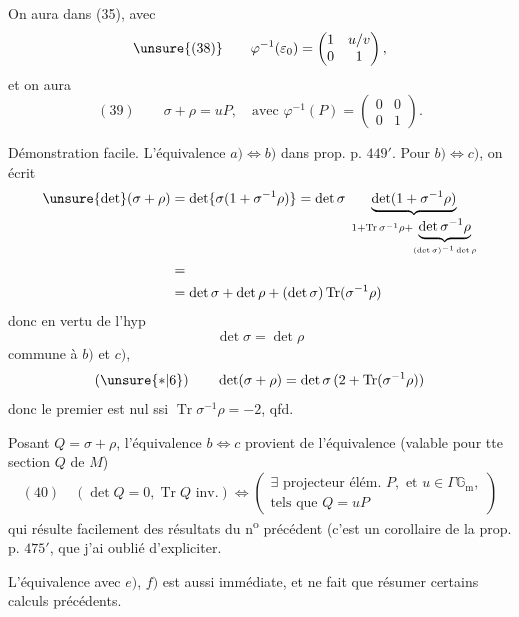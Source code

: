 
On aura dans (35), avec
\[
\unsure{(38)}\qquad\varphi^{-1}(\varepsilon_0)=\begin{pmatrix}1&u/v\\0&1\end{pmatrix},
\]
et on aura
\[
(39)\qquad\sigma+\rho=uP,\quad\text{avec }\varphi^{-1}(P)=\begin{pmatrix}0&0\\0&1\end{pmatrix}.
\]

Démonstration facile. L'équivalence $a)\Leftrightarrow b)$  dans prop. p. $449'$. Pour $b)\Leftrightarrow c)$, on écrit
\[
\begin{aligned}
\unsure{\det}(\sigma+\rho)
&=\det\{\sigma(1+\sigma^{-1}\rho)\}
=\det\sigma\;\underbrace{\det(1+\sigma^{-1}\rho)}_{1+\operatorname{Tr}\sigma^{-1}\rho+\underbrace{\det\sigma^{-1}\rho}_{(\det\sigma)^{-1}\det\rho}}\\
&=\\
&=\det\sigma+\det\rho+(\det\sigma)\operatorname{Tr}(\sigma^{-1}\rho)
\end{aligned}
\]
donc en vertu de l'hyp
\[
\det\sigma=\det\rho
\]
commune à $b)$ et $c)$, 
\[
(\unsure{*|6})\qquad\det(\sigma+\rho)=\det\sigma\,(2+\operatorname{Tr}(\sigma^{-1}\rho))
\]
donc le premier  est nul ssi $\operatorname{Tr}\sigma^{-1}\rho=-2$, qfd.



Posant $Q=\sigma+\rho$, l'équivalence $b\Leftrightarrow c$ provient de l'équivalence (valable pour tte section $Q$ de $M$)
\[
(40)\quad (\det Q=0,\operatorname{Tr}Q\text{ inv.})\Longleftrightarrow
\left(\begin{gathered}\exists\text{ projecteur élém. }P,\text{ et }u\in\Gamma\mathbb G_{\mathrm m},\\
\text{tels que }Q=uP\end{gathered}\right)
\]
qui résulte facilement des résultats du n\textsuperscript{o} précédent (c'est un corollaire de la prop. p. $475'$, que j'ai oublié d'expliciter.

L'équivalence avec $e)$, $f)$ est aussi immédiate,  et ne fait que résumer certains calculs précédents.


